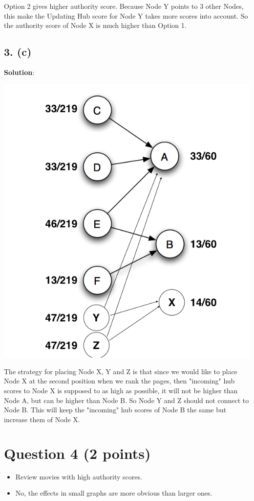 \documentclass[a4paper]{article}
\begin{document}
Option 2 gives higher authority score. Because Node Y points to 3 other Nodes, this make the Updating Hub score for Node Y takes more scores into account. So the authority score of Node X is much higher than Option 1.

\subsection{3. (c)}

\textbf{Solution}:\\

\begin{center}
  \includegraphics[scale=0.5]{fig4-c.png}
\end{center}


The strategy for placing Node X, Y and Z is that since we would like to place Node X at the second position when we rank the pages, then "incoming" hub scores to Node X is supposed to as high as possible, it will not be higher than Node A, but can be higher than Node B. So Node Y and Z should not connect to Node B. This will keep the "incoming" hub scores of Node B the same but increase them of Node X.


\newpage

\section{Question 4 (2 points)}

\begin{itemize}
\item Review movies with high authority scores.
\item No, the effects in small graphs are more obvious than larger ones.
\end{itemize}
\end{document}
